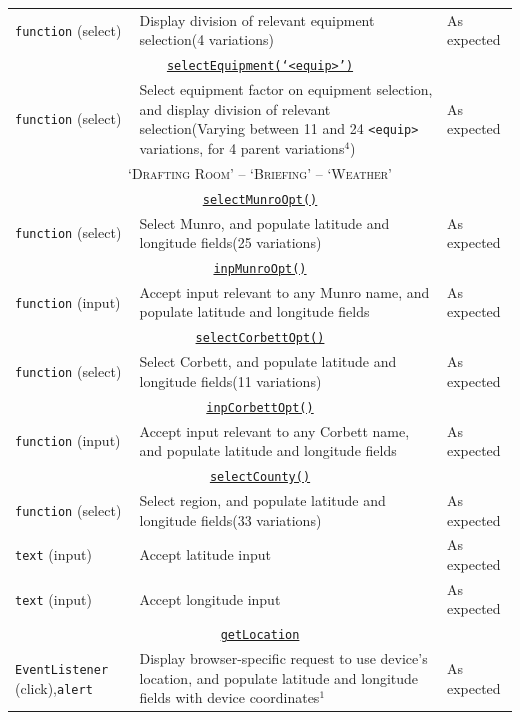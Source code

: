 \documentclass[11pt, english]{article}
\begin{document}
\begin{center}
\begin{longtable}{p{3cm}p{8cm}p{2cm}}
		\texttt{function} (select) & Display division of relevant equipment selection\newline (4 variations) & As expected\\
		\multicolumn{3}{c}{\underline{\texttt{selectEquipment(`<equip>')}}}\\
		\texttt{function} (select) & Select equipment factor on equipment selection, and display division of relevant selection\newline (Varying between 11 and 24 \texttt{<equip>} variations, for 4 parent variations$^{4}$) & As expected\\
		\hline
		\multicolumn{3}{c}{\textsc{`Drafting Room' -- `Briefing' -- `Weather'}}\\
		\hline
		\multicolumn{3}{c}{\underline{\texttt{selectMunroOpt()}}}\\
		\texttt{function} (select) & Select Munro, and populate latitude and longitude fields\newline (25 variations) & As expected\\
		\multicolumn{3}{c}{\underline{\texttt{inpMunroOpt()}}}\\
		\texttt{function} (input) & Accept input relevant to any Munro name, and populate latitude and longitude fields & As expected\\
		\multicolumn{3}{c}{\underline{\texttt{selectCorbettOpt()}}}\\
		\texttt{function} (select) & Select Corbett, and populate latitude and longitude fields\newline (11 variations) & As expected\\
		\multicolumn{3}{c}{\underline{\texttt{inpCorbettOpt()}}}\\
		\texttt{function} (input) & Accept input relevant to any Corbett name, and populate latitude and longitude fields & As expected\\
		\multicolumn{3}{c}{\underline{\texttt{selectCounty()}}}\\
		\texttt{function} (select) & Select region, and populate latitude and longitude fields\newline (33 variations) & As expected\\
		\texttt{text} (input) & Accept latitude input & As expected\\
		\texttt{text} (input) & Accept longitude input & As expected\\
		\multicolumn{3}{c}{\underline{\texttt{getLocation}}}\\
		\texttt{EventListener} (click),\newline \texttt{alert} & Display browser-specific request to use device's location, and populate latitude and longitude fields with device coordinates$^{1}$ & As expected\\

\end{longtable}
\end{center}
\end{document}

